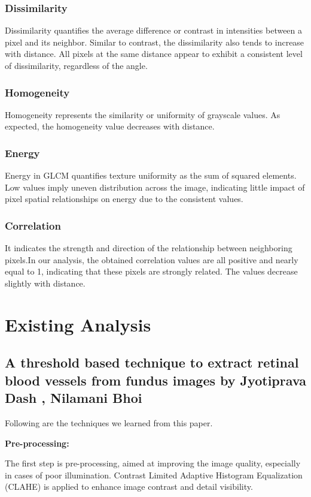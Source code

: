 \documentclass{article}
\begin{document}
\subsubsection{Dissimilarity}
Dissimilarity quantifies the average difference or contrast in intensities between a pixel and its neighbor. Similar to contrast, the dissimilarity also tends to increase with distance. All pixels at the same distance appear to exhibit a consistent level of dissimilarity, regardless of the angle.

\subsubsection{Homogeneity}
Homogeneity represents the similarity or uniformity of grayscale values. As expected, the homogeneity value decreases with distance.

\subsubsection{Energy}
Energy in GLCM quantifies texture uniformity as the sum of squared elements. Low values imply uneven distribution across the image, indicating little impact of pixel spatial relationships on energy due to the consistent values.

\subsubsection{Correlation}
It indicates the strength and direction of the relationship between neighboring pixels.In our analysis, the obtained correlation values are all positive and nearly equal to 1, indicating that these pixels are strongly related. The values decrease slightly with distance.


\section{ Existing Analysis }
\label{gen_inst}


\subsection{A threshold based technique to extract retinal blood vessels from fundus images by Jyotiprava Dash , Nilamani Bhoi }

Following are the techniques we learned from this paper.

\textbf{Pre-processing:}

The first step is pre-processing, aimed at improving the image quality, especially in cases of poor illumination.
Contrast Limited Adaptive Histogram Equalization (CLAHE) is applied to enhance image contrast and detail visibility.
\end{document}
